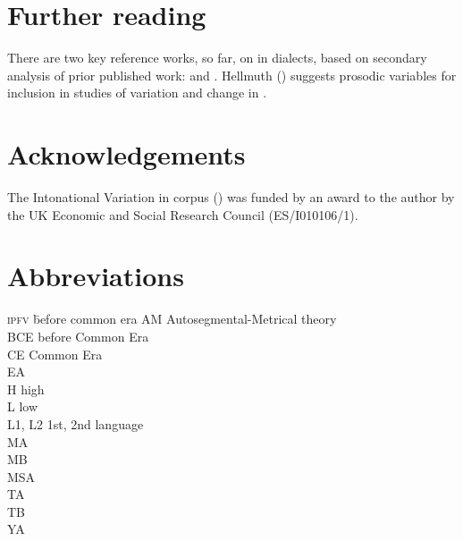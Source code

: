 \documentclass[output=paper]{langsci/langscibook}
\begin{document}
\section*{Further reading}

There are two key reference works, so far, on  in  dialects, based on secondary analysis of prior published work: \citet{Chahal2011} and \citet{ElZarka2017}. Hellmuth (\citeyear{Hellmuth2019}) suggests prosodic variables for inclusion in studies of variation and change in . 

\section*{Acknowledgements}

The Intonational Variation in  corpus (\citealt{HellmuthAlmbark2017}) was funded by an award to the author by the UK Economic and Social Research Council (ES/I010106/1).

\section*{Abbreviations}
\setlength{\columnsep}{30pt}
\begin{multicols}{2}
\begin{tabbing}
\textsc{ipfv} \hspace{1em} \= before common era\kill
AM \> Autosegmental-Metrical theory \hspace{10mm} \\
BCE \> before Common Era \\
CE \> Common Era \\
EA \>   \\
H \> high  \\
L \> low  \\
L1, L2 \> 1st, 2nd language \\
MA \>   \\
MB \>   \\
MSA \>   \\
TA \>   \\
TB \>   \\
YA \>  
\end{tabbing}
\end{multicols}

\sloppy
\printbibliography[heading=subbibliography,notkeyword=this]
\end{document}
